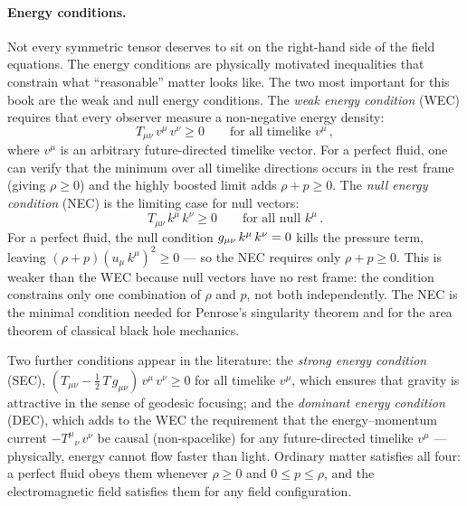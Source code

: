 \paragraph{Energy conditions.}

Not every symmetric tensor deserves to sit on the right-hand side of the
field equations.  The energy conditions are physically motivated
inequalities that constrain what ``reasonable'' matter looks like.  The
two most important for this book are the weak and null energy conditions.
The \emph{weak energy condition} (WEC) requires that every observer
measure a non-negative energy density:
%
\begin{equation}
  T_{\mu\nu}\, v^\mu\, v^\nu \geq 0
  \qquad \text{for all timelike } v^\mu \,,
  \label{eq:wec}
\end{equation}
%
where $v^\mu$ is an arbitrary future-directed timelike vector.  For a
perfect fluid, one can verify that the minimum over all timelike
directions occurs in the rest frame (giving $\rho \geq 0$) and the
highly boosted limit adds $\rho + p \geq 0$.  The \emph{null energy
condition} (NEC) is the limiting case for null vectors:
%
\begin{equation}
  T_{\mu\nu}\, k^\mu\, k^\nu \geq 0
  \qquad \text{for all null } k^\mu \,.
  \label{eq:nec}
\end{equation}
%
For a perfect fluid, the null condition $g_{\mu\nu}\,k^\mu\,k^\nu = 0$
kills the pressure term, leaving
$(\rho + p)(u_\mu\,k^\mu)^2 \geq 0$ --- so the NEC requires only
$\rho + p \geq 0$.  This is weaker than the WEC because null vectors
have no rest frame: the condition constrains only one combination of
$\rho$ and $p$, not both independently.  The NEC is the minimal
condition needed for Penrose's singularity theorem and for the area
theorem of classical black hole mechanics.

Two further conditions appear in the literature: the
\emph{strong energy condition} (SEC),
$(T_{\mu\nu} - \tfrac{1}{2}\,T\,g_{\mu\nu})\,v^\mu\,v^\nu \geq 0$ for
all timelike $v^\mu$, which ensures that gravity is attractive in the
sense of geodesic focusing; and the \emph{dominant energy condition}
(DEC), which adds to the WEC the requirement that the energy--momentum
current $-T^{\mu}{}_{\nu}\,v^\nu$ be causal (non-spacelike) for any
future-directed timelike $v^\mu$ --- physically, energy cannot flow faster
than light.  Ordinary matter satisfies all four: a perfect fluid obeys
them whenever $\rho \geq 0$ and $0 \leq p \leq \rho$, and the
electromagnetic field satisfies them for any field configuration.

